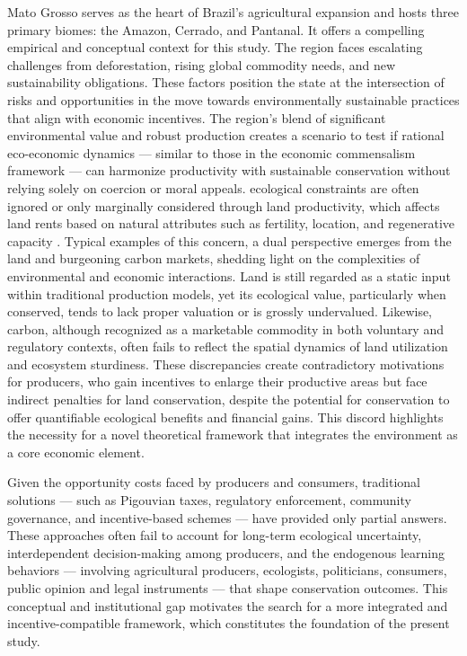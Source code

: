 Mato Grosso serves as the heart of Brazil's agricultural expansion and hosts three primary biomes: the Amazon, Cerrado, and Pantanal. It offers a compelling empirical and conceptual context for this study. The region faces escalating challenges from deforestation, rising global commodity needs, and new sustainability obligations. These factors position the state at the intersection of risks and opportunities in the move towards environmentally sustainable practices that align with economic incentives. The region's blend of significant environmental value and robust production creates a scenario to test if rational eco-economic dynamics — similar to those in the economic commensalism framework — can harmonize productivity with sustainable conservation without relying solely on coercion or moral appeals.
	ecological constraints are often ignored or only marginally considered through land productivity, which affects land rents based on natural attributes such as fertility, location, and regenerative capacity \cite{hubacek2002role}.
Typical examples of this concern, a dual perspective emerges from the land and burgeoning carbon markets, shedding light on the complexities of environmental and economic interactions. Land is still regarded as a static input within traditional production models, yet its ecological value, particularly when conserved, tends to lack proper valuation or is grossly undervalued. Likewise, carbon, although recognized as a marketable commodity in both voluntary and regulatory contexts, often fails to reflect the spatial dynamics of land utilization and ecosystem sturdiness. These discrepancies create contradictory motivations for producers, who gain incentives to enlarge their productive areas but face indirect penalties for land conservation, despite the potential for conservation to offer quantifiable ecological benefits and financial gains. This discord highlights the necessity for a novel theoretical framework that integrates the environment as a core economic element.

Given the opportunity costs faced by producers and consumers, traditional solutions — such as Pigouvian taxes, regulatory enforcement, community governance, and incentive-based schemes — have provided only partial answers. These approaches often fail to account for long-term ecological uncertainty, interdependent decision-making among producers, and the endogenous learning behaviors — involving agricultural producers, ecologists, politicians, consumers, public opinion and legal instruments — that shape conservation outcomes. This conceptual and institutional gap motivates the search for a more integrated and incentive-compatible framework, which constitutes the foundation of the present study.

